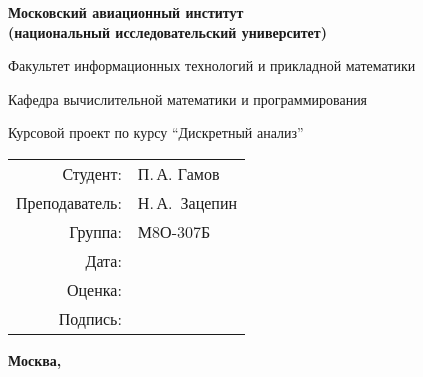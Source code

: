 \begin{titlepage}
\begin{center}
\bfseries
{\Large Московский авиационный институт\\ (национальный исследовательский университет)}

\vspace{48pt}
{\large Факультет информационных технологий и прикладной математики}

\vspace{36pt}
{\large Кафедра вычислительной математики и программирования}

\vspace{48pt}Курсовой проект по курсу 
\enquote{Дискретный анализ}
\end{center}
\vspace{72pt}

\begin{flushright}
\begin{tabular}{rl}
Студент: & П.\,А. Гамов \\
Преподаватель: & Н.\,А.\ Зацепин \\
Группа: & М8О-307Б \\
Дата: & \\
Оценка: & \\
Подпись: & \\
\end{tabular}
\end{flushright}
\vfill
\begin{center}
\bfseries
Москва, \the\year
\end{center}
\end{titlepage}

\pagebreak